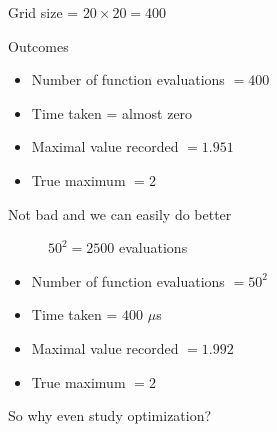 \begin{frame}
    
    Grid size = $20 \times 20 = 400$

    Outcomes

    \begin{itemize}
        \item Number of function evaluations $= 400$
        \item Time taken = almost zero 
        \item Maximal value recorded $= 1.951$
        \item True maximum $= 2$
    \end{itemize}

    Not bad and we can easily do better

\end{frame}


\begin{frame}
    
    \begin{figure}
       \begin{center}
           \caption{$50^2 = 2500$ evaluations}
       \end{center}
    \end{figure}

\end{frame}


\begin{frame}
    
    \begin{itemize}
        \item Number of function evaluations $= 50^2$
        \item Time taken = $400$ $\mu$s
        \item Maximal value recorded $= 1.992$
        \item True maximum $= 2$
    \end{itemize}

    \vspace{1em}

    So why even study optimization?

\end{frame}


